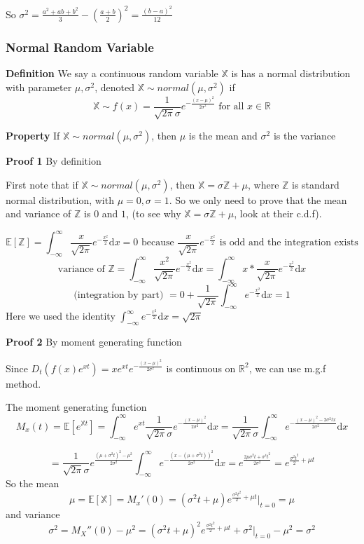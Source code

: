 \documentclass[a4paper,12pt]{article}
\begin{document}
So $\sigma^2 = \frac{a^2 + ab + b^2}{3} - (\frac{a+b}{2})^2 = \frac{(b-a)^2}{12}$

\subsubsection{Normal Random Variable}
\textbf{Definition} We say a continuous random variable $\mathbb{X}$ is has a normal distribution with parameter $\mu, \sigma^2$, denoted $\mathbb{X} \sim normal(\mu, \sigma^2)$ if
$$
 \mathbb{X} \sim f(x) = \frac{1}{\sqrt{2\pi}\sigma}e^{-\frac{(x-\mu)^2}{2\sigma^2}}
 \text{ for all } x\in\mathbb{R}
$$

\textbf{Property} If $\mathbb{X} \sim normal(\mu, \sigma^2)$, then $\mu$ is the mean and $\sigma^2$ is the variance 

\textbf{Proof 1} By definition

First note that if $\mathbb{X} \sim normal(\mu, \sigma^2)$, then $\mathbb{X} = \sigma\mathbb{Z}+\mu$, where $\mathbb{Z}$ is standard normal distribution, with $\mu = 0, \sigma = 1$. So we only need to prove that the mean and variance of $\mathbb{Z}$ is $0$ and $1$, (to see why $\mathbb{X} = \sigma\mathbb{Z}+\mu$, look at their c.d.f).

$$\mathbb{E}[\mathbb{Z}] = \int_{-\infty}^\infty \frac{x}{\sqrt{2\pi}} e^{-\frac{x^2}{2}}\mathrm{d}x = 0 \text{ because } \frac{x}{\sqrt{2\pi}} e^{-\frac{x^2}{2}} \text{ is odd and the integration exists}$$
$$\text{variance of } \mathbb{Z} = \int_{-\infty}^\infty \frac{x^2}{\sqrt{2\pi}} e^{-\frac{x^2}{2}}\mathrm{d}x = \int_{-\infty}^\infty x * \frac{x}{\sqrt{2\pi}} e^{-\frac{x^2}{2}}\mathrm{d}x$$
$$\text{(integration by part) } = 0 + \frac{1}{\sqrt{2\pi}} \int_{-\infty}^\infty e^{-\frac{x^2}{2}}\mathrm{d}x = 1$$
Here we used the identity $\int_{-\infty}^\infty e^{-\frac{x^2}{2}}\mathrm{d}x = \sqrt{2\pi}$ 

\textbf{Proof 2} By moment generating function 

Since $D_t (f(x)e^{xt}) = xe^{xt}e^{-\frac{(x-\mu)^2}{2\sigma^2}}$ is continuous on $\mathbb{R}^2$, we can use m.g.f method.

The moment generating function
$$M_x(t) = \mathbb{E}[e^{\mathbb{X}t}] = \int_{-\infty}^\infty e^{xt} \frac{1}{\sqrt{2\pi}\sigma}e^{-\frac{(x-\mu)^2}{2\sigma^2}} \mathrm{d}x = \frac{1}{\sqrt{2\pi}\sigma} \int_{-\infty}^\infty e^{-\frac{(x-\mu)^2-2 \sigma^2 t x}{2\sigma^2}} \mathrm{d}x$$

$$= \frac{1}{\sqrt{2\pi}\sigma} e^{\frac{(\mu+\sigma^2 t)^2 - \mu^2}{2\sigma^2}} \int_{-\infty}^\infty e^{-\frac{(x-(\mu+\sigma^2 t))^2}{2\sigma^2}} \mathrm{d}x = e^{\frac{2\mu\sigma^2 t+\sigma^4 t^2 }{2\sigma^2}} = e^{\frac{\sigma^2 t^2}{2}+\mu t}$$
So the mean
$$ \mu = \mathbb{E}[\mathbb{X}] = M_x'(0) = (\sigma^2 t + \mu) e^{\frac{\sigma^2 t^2}{2}+\mu t} |_{t=0} = \mu$$
and variance
$$\sigma^2 = M_X''(0) - \mu^2 = (\sigma^2 t + \mu)^2 e^{\frac{\sigma^2 t^2}{2}+\mu t} + \sigma^2 |_{t=0} - \mu^2 = \sigma^2$$
\end{document}

